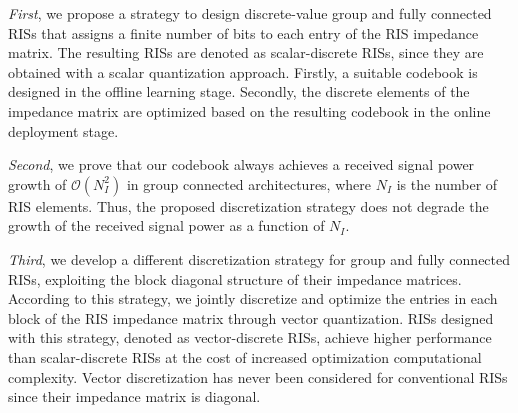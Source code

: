 \documentclass[twocolumn,10pt]{IEEEtran}
\begin{document}
\textit{First}, we propose a strategy to design discrete-value group and fully connected RISs that assigns a finite number of bits to each entry of the RIS impedance matrix.
The resulting RISs are denoted as scalar-discrete RISs, since they are obtained with a scalar quantization approach.
Firstly, a suitable codebook is designed in the offline learning stage.
Secondly, the discrete elements of the impedance matrix are optimized based on the resulting codebook in the online deployment stage.

\textit{Second}, we prove that our codebook always achieves a received signal power growth of $\mathcal{O}(N_I^2)$ in group connected architectures, where $N_I$ is the number of RIS elements.
Thus, the proposed discretization strategy does not degrade the growth of the received signal power as a function of $N_I$.

\textit{Third}, we develop a different discretization strategy for group and fully connected RISs, exploiting the block diagonal structure of their impedance matrices.
According to this strategy, we jointly discretize and optimize the entries in each block of the RIS impedance matrix through vector quantization.
RISs designed with this strategy, denoted as vector-discrete RISs, achieve higher performance than scalar-discrete RISs at the cost of increased optimization computational complexity.
Vector discretization has never been considered for conventional RISs since their impedance matrix is diagonal.
\end{document}

